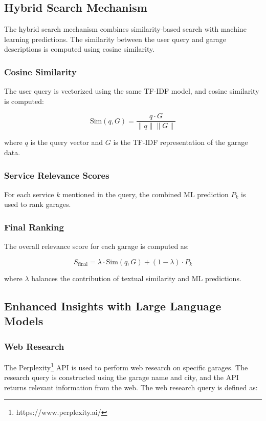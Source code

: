 \documentclass[conference]{IEEEtran}
\begin{document}
\subsection{Hybrid Search Mechanism}
The hybrid search mechanism combines similarity-based search with machine learning predictions. The similarity between the user query and garage descriptions is computed using cosine similarity.

\subsubsection{Cosine Similarity}
The user query is vectorized using the same TF-IDF model, and cosine similarity is computed:

\[
\text{Sim}(q, G) = \frac{q \cdot G}{\|q\| \|G\|}
\]

where \(q\) is the query vector and \(G\) is the TF-IDF representation of the garage data.

\subsubsection{Service Relevance Scores}
For each service \(k\) mentioned in the query, the combined ML prediction \(P_k\) is used to rank garages.

\subsubsection{Final Ranking}
The overall relevance score for each garage is computed as:

\[
S_{\text{final}} = \lambda \cdot \text{Sim}(q, G) + (1 - \lambda) \cdot P_k
\]

where \(\lambda\) balances the contribution of textual similarity and ML predictions.

\subsection{Enhanced Insights with Large Language Models}

\subsubsection{Web Research}
The Perplexity\footnote{https://www.perplexity.ai/} API is used to perform web research on specific garages. The research query is constructed using the garage name and city, and the API returns relevant information from the web. The web research query is defined as:
\end{document}
